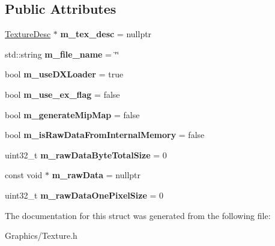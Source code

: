 \subsection*{Public Attributes}
\begin{DoxyCompactItemize}
\item 
\mbox{\label{structTextureLoadDesc_a3d6b40df88a1d0b66ad5a65320e5ddad}} 
\hyperlink{structTextureDesc}{Texture\+Desc} $\ast$ {\bfseries m\+\_\+tex\+\_\+desc} = nullptr
\item 
\mbox{\label{structTextureLoadDesc_a6ed3fea14517a4f1b1bec0a646908e08}} 
std\+::string {\bfseries m\+\_\+file\+\_\+name} = \char`\"{}\char`\"{}
\item 
\mbox{\label{structTextureLoadDesc_a842130f89406cc5a0131c02204d74c54}} 
bool {\bfseries m\+\_\+use\+D\+X\+Loader} = true
\item 
\mbox{\label{structTextureLoadDesc_aae0cb39ddf4cac69e7a136a4ac5349f4}} 
bool {\bfseries m\+\_\+use\+\_\+ex\+\_\+flag} = false
\item 
\mbox{\label{structTextureLoadDesc_a39e741cf03883e222cee9a460dc0a8ed}} 
bool {\bfseries m\+\_\+generate\+Mip\+Map} = false
\item 
\mbox{\label{structTextureLoadDesc_acdc417815d08babd7e78ddd067a1c8e1}} 
bool {\bfseries m\+\_\+is\+Raw\+Data\+From\+Internal\+Memory} = false
\item 
\mbox{\label{structTextureLoadDesc_af355a44f75c5c0f79678cc0afba4c75c}} 
uint32\+\_\+t {\bfseries m\+\_\+raw\+Data\+Byte\+Total\+Size} = 0
\item 
\mbox{\label{structTextureLoadDesc_a977aba700e946e893c112fa7bdc15798}} 
const void $\ast$ {\bfseries m\+\_\+raw\+Data} = nullptr
\item 
\mbox{\label{structTextureLoadDesc_a5d8742958fd7b319c48c072c2d507936}} 
uint32\+\_\+t {\bfseries m\+\_\+raw\+Data\+One\+Pixel\+Size} = 0
\end{DoxyCompactItemize}


The documentation for this struct was generated from the following file\+:\begin{DoxyCompactItemize}
\item 
Graphics/Texture.\+h\end{DoxyCompactItemize}
